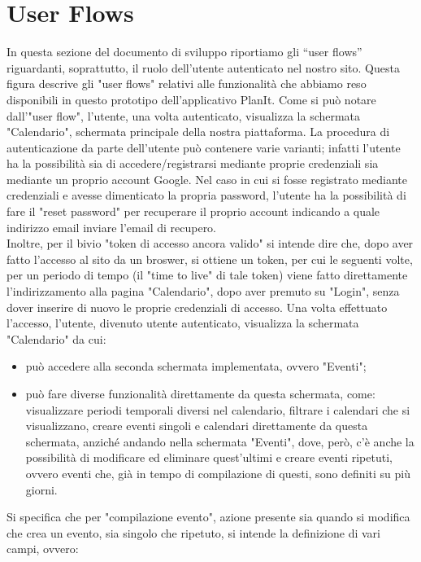 \section{User Flows}
\label{secD4:UserFlows}

In questa sezione del documento di sviluppo riportiamo gli “user flows” riguardanti, soprattutto, il ruolo dell'utente autenticato nel nostro sito.
Questa figura descrive gli "user flows" relativi alle funzionalità che abbiamo reso disponibili in questo prototipo dell'applicativo PlanIt. Come si può notare dall'"user flow", l'utente, una volta autenticato, visualizza la schermata "Calendario", schermata principale della nostra piattaforma. La procedura di autenticazione da parte dell'utente può contenere varie varianti; infatti l'utente ha la possibilità sia di accedere/registrarsi mediante proprie credenziali sia mediante un proprio account Google. Nel caso in cui si fosse registrato mediante credenziali e avesse dimenticato la propria password, l'utente ha la possibilità di fare il "reset password" per recuperare il proprio account indicando a quale indirizzo email inviare l'email di recupero. \\ Inoltre, per il bivio "token di accesso ancora valido" si intende dire che, dopo aver fatto l'accesso al sito da un broswer, si ottiene un token, per cui le seguenti volte, per un periodo di tempo (il "time to live" di tale token) viene fatto direttamente l'indirizzamento alla pagina "Calendario", dopo aver premuto su "Login", senza dover inserire di nuovo le proprie credenziali di accesso.
Una volta effettuato l'accesso, l'utente, divenuto utente autenticato, visualizza la schermata "Calendario" da cui:
\begin{itemize}
    \item può accedere alla seconda schermata implementata, ovvero "Eventi";
    \item può fare diverse funzionalità direttamente da questa schermata, come: visualizzare periodi temporali diversi nel calendario, filtrare i calendari che si visualizzano, creare eventi singoli e calendari direttamente da questa schermata, anziché andando nella schermata "Eventi", dove, però, c'è anche la possibilità di modificare ed eliminare quest'ultimi e creare eventi ripetuti, ovvero eventi che, già in tempo di compilazione di questi, sono definiti su più giorni.
\end{itemize}
Si specifica che per "compilazione evento", azione presente sia quando si modifica che crea un evento, sia singolo che ripetuto, si intende la definizione di vari campi, ovvero:
